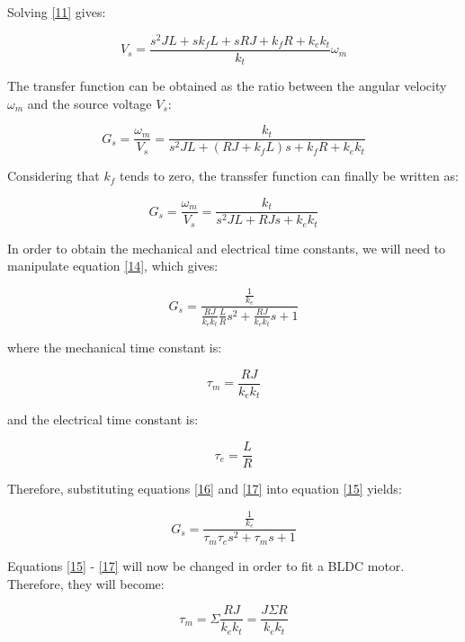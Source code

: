 Solving \ref{11} gives:

\begin{equation}
\label{12}
	V_{s}=\frac{s^{2}JL+sk_{f}L+sRJ+k_{f}R+k_{e}k_{t}}{k_{t}}\omega_{m}
\end{equation} 

The transfer function can be obtained as the ratio between the angular velocity $\omega_{m}$ and the source voltage $V_{s}$:

\begin{equation}
\label{13}
	G_{s}=\frac{\omega_{m}}{V_{s}}=\frac{k_{t}}{s^{2}JL+(RJ+k_{f}L)s+k_{f}R+k_{e}k_{t}}
\end{equation} 

Considering that $k_{f}$ tends to zero, the transsfer function can finally be  written as:

\begin{equation}
\label{14}
	G_{s}=\frac{\omega_{m}}{V_{s}}=\frac{k_{t}}{s^{2}JL+RJs+k_{e}k_{t}}
\end{equation} 

In order to obtain the mechanical and electrical time constants, we will need to manipulate equation \ref{14}, which gives:

\begin{equation}
\label{15}
	G_{s}=\frac{\frac{1}{k_{e}}}{\frac{RJ}{k_{e}k_{t}}\frac{L}{R}s^{2}+\frac{RJ}{k_{e}k_{t}}s+1}
\end{equation}

where the mechanical time constant is:

\begin{equation}
\label{16}
	\tau_{m}=\frac{RJ}{k_{e}k_{t}}
\end{equation}

and the electrical time constant is:

\begin{equation}
\label{17}
	\tau_{e}=\frac{L}{R}
\end{equation}

Therefore, substituting equations \ref{16} and \ref{17} into equation \ref{15} yields:

\begin{equation}
\label{18}
	G_{s}=\frac{\frac{1}{k_{e}}}{\tau_{m}\tau_{e}s^{2}+\tau_{m}s+1}
\end{equation}

Equations \ref{15} - \ref{17} will now be changed in order to fit a BLDC motor. Therefore, they will become:

\begin{equation}
\label{19}
	\tau_{m}=\Sigma{\frac{RJ}{k_{e}k_{t}}}=\frac{J\Sigma{R}}{k_{e}k_{t}}
\end{equation}

